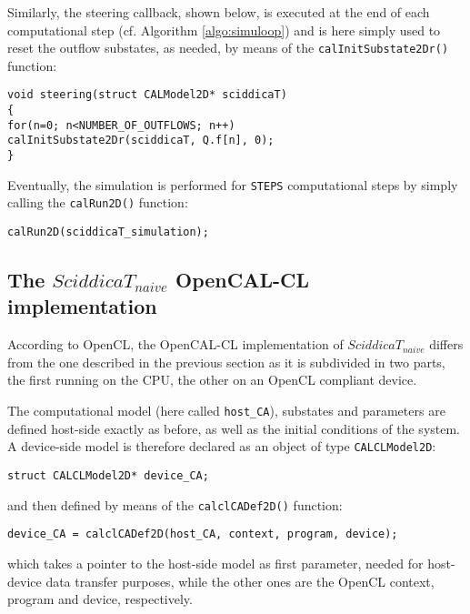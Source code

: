 \noindent Similarly, the steering callback, shown below, is executed at the
end of each computational step (cf. Algorithm \ref{algo:simuloop})
and is here simply used to reset the outflow substates, as needed,
by means of the \verb'calInitSubstate2Dr()' function:

\begin{lstlisting}[basicstyle=\footnotesize, numbers=none]
void steering(struct CALModel2D* sciddicaT)
{
for(n=0; n<NUMBER_OF_OUTFLOWS; n++)
calInitSubstate2Dr(sciddicaT, Q.f[n], 0);
}
\end{lstlisting}

\noindent Eventually, the simulation is performed for \verb'STEPS'
computational steps by simply calling the \verb'calRun2D()'
function:

\begin{lstlisting}[basicstyle=\footnotesize, numbers=none]
calRun2D(sciddicaT_simulation);
\end{lstlisting}


\subsection{The $SciddicaT_{naive}$ OpenCAL-CL implementation}
According to OpenCL, the OpenCAL-CL implementation of
$SciddicaT_{naive}$ differs from the one described in the previous
section as it is subdivided in two parts, the first running on the
CPU, the other on an OpenCL compliant device.

The computational model (here called \verb'host_CA'), substates and
parameters are defined host-side exactly as before, as well as the
initial conditions of the system. A device-side model is therefore
declared as an object of type \verb'CALCLModel2D':

\begin{lstlisting}[basicstyle=\footnotesize, numbers=none]
struct CALCLModel2D* device_CA;
\end{lstlisting}

\noindent and then defined by means of the \verb'calclCADef2D()'
function:

\begin{lstlisting}[basicstyle=\footnotesize, numbers=none]
device_CA = calclCADef2D(host_CA, context, program, device);
\end{lstlisting}

\noindent which takes a pointer to the host-side model as first
parameter, needed for host-device data transfer purposes, while the
other ones are the OpenCL context, program and device, respectively.

